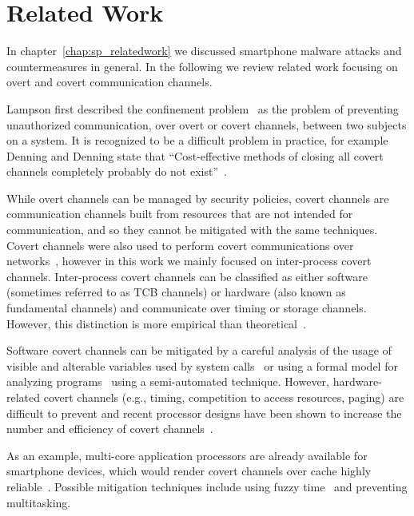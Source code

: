 \section{Related Work}

In chapter~\ref{chap:sp_relatedwork} we discussed smartphone malware attacks and countermeasures in general. In the following we review related work focusing on overt and covert communication channels.

Lampson first described the confinement problem~\cite{Lampson:note_on_confinment} as the problem of preventing unauthorized communication, over overt or covert channels, between two subjects on a system. It is recognized to be a difficult problem in practice, for example Denning and Denning state that ``Cost-effective methods of closing all covert channels completely probably do not exist''~\cite{Denning:1979:DS:356778.356782}.

While overt channels can be managed by security policies, covert channels are communication channels built from resources that are not intended for communication, and so they cannot be mitigated with the same techniques. Covert channels were also used to perform covert communications over networks~\cite{Petitcolas99informationhiding,DBLP:journals/tse/Girling87}, however in this work we mainly focused on inter-process covert channels. Inter-process covert channels can be classified as either software (sometimes referred to as TCB channels) or hardware (also known as fundamental channels) and communicate over timing or storage channels. However, this distinction is more empirical than theoretical~\cite{CovertChannel_NCSC}.

Software covert channels can be mitigated by a careful analysis of the usage of visible and alterable variables used by system calls~\cite{Tsai:1990:ICS:79215.79217} or using a formal model for analyzing programs~\cite{Shaffer:2008:SDM:1375696.1375703} using a semi-automated technique. However, hardware-related covert channels (e.g., timing, competition to access resources, paging) are difficult to prevent and recent processor designs have been shown to increase the number and efficiency of covert channels~\cite{DBLP:conf/acsac/WangL06}.

As an example, multi-core application processors are already available for smartphone devices, which would render covert channels over cache highly reliable~\cite{DBLP:conf/acsac/WangL06}. Possible mitigation techniques include using fuzzy time~\cite{Reducing_timing_channels_with_fuzzy_time} and preventing multitasking.


